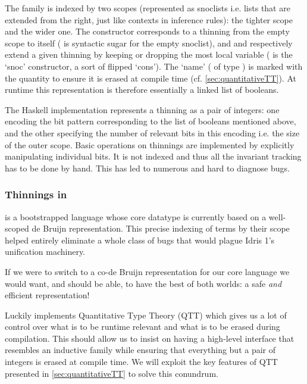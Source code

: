 %
The  family is indexed by two scopes (represented as snoclists
i.e. lists that are extended from the right, just like contexts in inference rules):
 the tighter scope and  the wider one.
%
The  constructor corresponds to a thinning from the empty scope to
itself (\IdrisData{[<]} is \idris{} syntactic sugar for the empty snoclist),
and  and  respectively extend a given thinning
by keeping or dropping the most local variable (\IdrisData{:<} is the `snoc'
constructor, a sort of flipped `cons').
%
The `name' ( of type ) is marked with the quantity
 to ensure it is erased at compile time (cf. \cref{sec:quantitativeTT}).
%
At runtime this representation is therefore essentially a linked list of booleans.

The Haskell implementation represents a thinning as a pair of integers: one encoding
the bit pattern corresponding to the list of booleans mentioned above, and the other
specifying the number of relevant bits in this encoding i.e. the size of the outer scope.
%
Basic operations on thinnings are implemented by explicitly manipulating individual bits.
%
It is not indexed and thus all the invariant tracking has to be done by hand.
This has led to numerous and hard to diagnose bugs.

\subsubsection{Thinnings in \idris}

\idris{} is a bootstrapped language whose core datatype is currently based on
a well-scoped de Bruijn representation.
%
This precise indexing of terms by their scope helped entirely eliminate a whole
class of bugs that would plague Idris 1's unification machinery.

If we were to switch to a co-de Bruijn representation for our core language we
would want, and should be able, to have the best of both worlds:
a safe \emph{and} efficient representation!

Luckily \idris{} implements Quantitative Type Theory (QTT) which gives us a
lot of control over what is to be runtime relevant and what is to be erased
during compilation.
%
This should allow us to insist on having a high-level interface that resembles
an inductive family while ensuring that everything but a pair of integers is erased
at compile time.
%
We will exploit the key features of QTT presented in \cref{sec:quantitativeTT}
to solve this conundrum.
